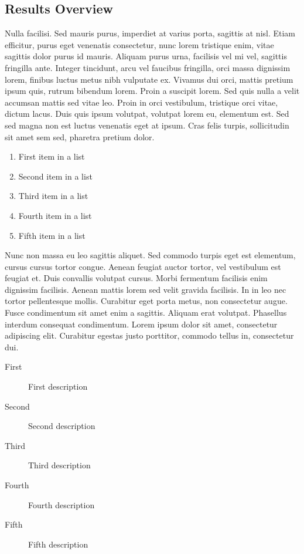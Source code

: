 \documentclass[
10pt, %
a4paper, %
twocolumn, %
landscape %
]{article}
\begin{document}
\begin{CJK*}{UTF8}{gbsn}

\section{Results Overview}

Nulla facilisi. Sed mauris purus, imperdiet at varius porta, sagittis at nisl. Etiam efficitur, purus eget venenatis consectetur, nunc lorem tristique enim, vitae sagittis dolor purus id mauris. Aliquam purus urna, facilisis vel mi vel, sagittis fringilla ante. Integer tincidunt, arcu vel faucibus fringilla, orci massa dignissim lorem, finibus luctus metus nibh vulputate ex. Vivamus dui orci, mattis pretium ipsum quis, rutrum bibendum lorem. Proin a suscipit lorem. Sed quis nulla a velit accumsan mattis sed vitae leo. Proin in orci vestibulum, tristique orci vitae, dictum lacus. Duis quis ipsum volutpat, volutpat lorem eu, elementum est. Sed sed magna non est luctus venenatis eget at ipsum. Cras felis turpis, sollicitudin sit amet sem sed, pharetra pretium dolor.

\begin{enumerate}
\item First item in a list
\item Second item in a list
\item Third item in a list
\item Fourth item in a list
\item Fifth item in a list
\end{enumerate}

Nunc non massa eu leo sagittis aliquet. Sed commodo turpis eget est elementum, cursus cursus tortor congue. Aenean feugiat auctor tortor, vel vestibulum est feugiat et. Duis convallis volutpat cursus. Morbi fermentum facilisis enim dignissim facilisis. Aenean mattis lorem sed velit gravida facilisis. In in leo nec tortor pellentesque mollis. Curabitur eget porta metus, non consectetur augue. Fusce condimentum sit amet enim a sagittis. Aliquam erat volutpat. Phasellus interdum consequat condimentum. Lorem ipsum dolor sit amet, consectetur adipiscing elit. Curabitur egestas justo porttitor, commodo tellus in, consectetur dui.

\begin{description}
\item[First] First description
\item[Second] Second description
\item[Third] Third description
\item[Fourth] Fourth description
\item[Fifth] Fifth description
\end{description}


\end{CJK*}
\end{document}

